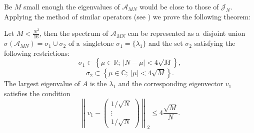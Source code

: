 Be \( M \) small enough
    the eigenvalues of \( \mathscr{A}_{MN} \) would be close to those of \( \mathcal{J}_N \).
Applying the method of similar operators (see \cite{baskakov-harmonic,baskakov1983})
    we prove the following theorem:
\begin{thm}\label{kozlukovsv:thm:almost-all-ones}
    Let \( M < \frac{N^2}{16} \),
    then the spectrum of \( \mathscr{A}_{MN} \)
    can be represented as a~disjoint union
    \( \sigma\left(\mathscr{A}_{MN}\right) = \sigma_1 \cup \sigma_2 \)
    of a~singletone \( \sigma_1=\{\lambda_1\} \)
    and the set \( \sigma_2 \) satisfying the following restrictions:
    \[
        \sigma_1 \subset \left\{
            \mu\in\mathbb{R};\ \lvert N - \mu \rvert < 4\sqrt{M}
            \right\},
        \]
    \[ \sigma_2 \subset \left\{ \mu\in\mathbb{C};\ \lvert \mu \rvert < 4\sqrt{M} \right\}. \]
    The largest eigenvalue of \( A \)
    is the \( \lambda_1 \)
    and the corresponding eigenvector \( v_1 \) satisfies
    the condition
    \[ \left\|v_1 - 
    \begin{pmatrix} 1/\sqrt{N}\\ \vdots \\ 1/\sqrt{N}\end{pmatrix}\right\|_2
        \leq 4\frac{\sqrt{M}}{N}. \]
\end{thm}

